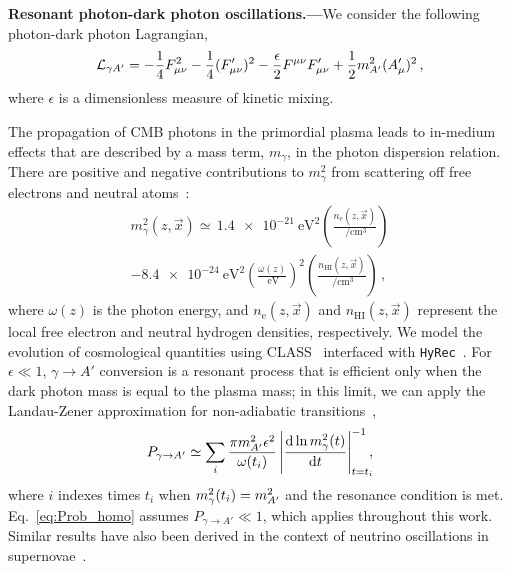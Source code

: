 \documentclass[prd,aps,10pt,nofootinbib,twocolumn,superscriptaddress,preprintnumbers,balancelastpage,longbibliography]{revtex4-1}
\begin{document}
\noindent
{\bf Resonant photon-dark photon oscillations.---}We consider the following photon-dark photon Lagrangian, 
\begin{equation}
\mathcal{L}_{\gamma A'}=-\frac{1}{4}F_{\mu \nu}^{2}-\frac{1}{4}(F_{\mu \nu}^{\prime})^{2}-\frac{\epsilon}{2} F^{\mu \nu} F_{\mu \nu}^{\prime}+\frac{1}{2} m_{A^\prime}^{2}(A_{\mu}^{\prime})^{2} \, ,
\end{equation}
where  $\epsilon$ is a dimensionless measure of kinetic mixing.

The propagation of CMB photons in the primordial plasma leads to in-medium effects that are described by a mass term, $m_\gamma$, in the photon dispersion relation.  There are positive and negative contributions to $m_{\gamma}^{2}$ from scattering off free electrons and neutral atoms~\cite{Kunze:2015noa,Mirizzi:2009iz}:
\begin{multline}
    {m_{\gamma}^2(z, \vec{x})} \simeq \, \SI{1.4e-21}{\eV\squared} \left(\frac{n_\mathrm{e}(z, \vec{x})}{\SI{}{\per\centi\meter\cubed}}\right)  \label{eq:m_gamma_sq}  \\
      - \SI{8.4e-24}{\eV\squared} \left( \frac{\omega(z)}{\SI{}{\eV}} \right)^2 \left(\frac{n_{\mathrm{HI}}(z, \vec{x})}{\SI{}{\per\centi\meter\cubed}}\right)  \,, 
\end{multline}
where $\omega(z)$ is the photon energy, and  $n_\mathrm{e}(z, \vec{x})$ and $n_\mathrm{HI}(z, \vec{x})$ represent the local free electron and neutral hydrogen densities, respectively. We model the evolution of cosmological quantities using CLASS~\cite{Blas:2011rf} interfaced with \texttt{HyRec}~\cite{AliHaimoud:2010dx}. For $\epsilon \ll 1$, $\gamma \to A'$ conversion is a resonant process that is efficient only when the dark photon mass is equal to the plasma mass; in this limit, we can apply the Landau-Zener approximation for non-adiabatic transitions~\cite{Mirizzi:2009iz},
%
\begin{equation}
    P_{\gamma \rightarrow A'} \simeq \sum_i \frac{\pi m_{A^\prime}^{2} \epsilon^{2}}{\omega(t_i)}\left|\frac{\mathrm{d}\ln m_{\gamma}^{2}(t)}{\mathrm{d} t}\right|_{t=t_i}^{-1} \!\!\!,
    \label{eq:Prob_homo}
\end{equation}
%
where $i$ indexes times $t_i$ when $m_\gamma^2(t_i) = m_{A^\prime}^2$ and the resonance condition is met.  Eq.~\eqref{eq:Prob_homo} assumes $P_{\gamma \rightarrow A'} \ll 1$, which applies throughout this work. Similar results have also been derived in the context of neutrino oscillations in supernovae~\cite{Dasgupta:2005wn,Friedland:2006ta,Fogli:2006xy}. 
\end{document}

